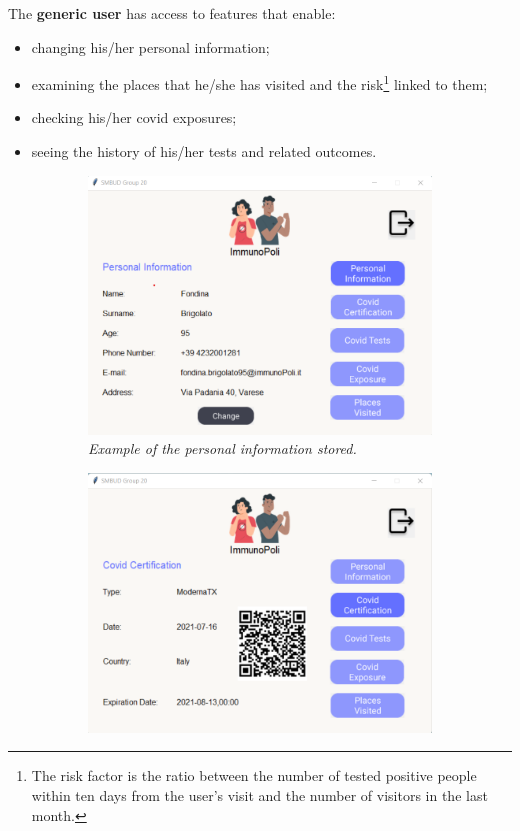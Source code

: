 \noindent
The \textbf{generic user} has access to features that enable:
\begin{itemize}
    \item changing his/her personal information;
    \item examining the places that he/she has visited and the risk\footnote{The risk factor is the ratio between the number of tested positive people within ten days from the user's visit and the number of visitors in the last month.} linked to them;
    \item checking his/her covid exposures;
    \item seeing the history of his/her tests and related outcomes.
\end{itemize}

\begin{figure}[h]
    \begin{subfigure}{.5\textwidth}
        \centering
        \includegraphics[width=\linewidth]{images/application_screenshots/user_information_page.png}  
  \caption{\textit{Example of the personal information stored.}}
  \label{fig: personal_information}
\end{subfigure}
\begin{subfigure}{.5\textwidth}
  \centering
  \includegraphics[width=\linewidth]{images/application_screenshots/covid_certification.png}  

\end{subfigure}
\end{figure}
